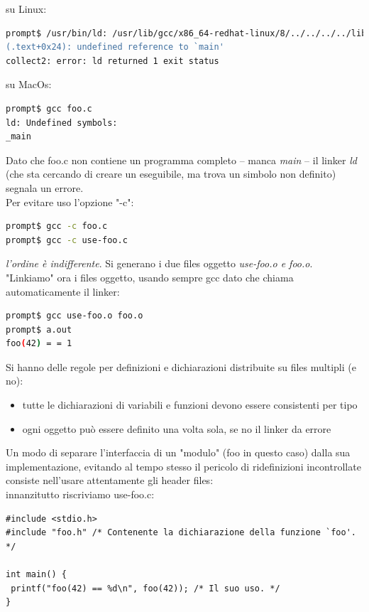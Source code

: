 \documentclass[a4paper,12pt, oneside]{book}
\begin{document}
	su Linux:
	\begin{shaded}
		\begin{lstlisting}[language=bash]
prompt$ /usr/bin/ld: /usr/lib/gcc/x86_64-redhat-linux/8/../../../../lib64/crt1.o: in function `_start':
(.text+0x24): undefined reference to `main'
collect2: error: ld returned 1 exit status
\end{lstlisting}
	\end{shaded}
	su MacOs:
	\begin{shaded}
		\begin{lstlisting}[language=bash]
prompt$ gcc foo.c
ld: Undefined symbols:
_main
\end{lstlisting}
	\end{shaded}
	Dato che foo.c non contiene un programma completo – manca \textit{main} – il linker \textit{ld} (che sta cercando di creare un eseguibile, ma trova un simbolo non definito) segnala un errore.\\
	Per evitare uso l'opzione "-c":
	\begin{shaded}
		\begin{lstlisting}[language=bash]
prompt$ gcc -c foo.c
prompt$ gcc -c use-foo.c
\end{lstlisting}
	\end{shaded}
	\textit{l'ordine è indifferente}. Si generano i due files oggetto \textit{use-foo.o e foo.o}. "Linkiamo" ora i files oggetto, usando sempre gcc dato che chiama automaticamente il linker:
	\begin{shaded}
		\begin{lstlisting}[language=bash]
prompt$ gcc use-foo.o foo.o
prompt$ a.out
foo(42) = = 1
\end{lstlisting}
	\end{shaded}
	Si hanno delle regole per definizioni e dichiarazioni distribuite su files multipli (e no):
	\begin{itemize}
		\item tutte le dichiarazioni di variabili e funzioni devono essere consistenti per tipo
		\item ogni oggetto può essere definito una volta sola, se no il linker da errore
	\end{itemize}
	Un modo di separare l'interfaccia di un "modulo" (foo in questo caso) dalla sua implementazione, evitando al tempo stesso il pericolo di ridefinizioni incontrollate consiste nell'usare attentamente gli header files:\\
	innanzitutto riscriviamo use-foo.c:
	\begin{verbatim}
#include <stdio.h>
#include "foo.h" /* Contenente la dichiarazione della funzione `foo'. */

int main() {
 printf("foo(42) == %d\n", foo(42)); /* Il suo uso. */
}
\end{verbatim}
\end{document}
